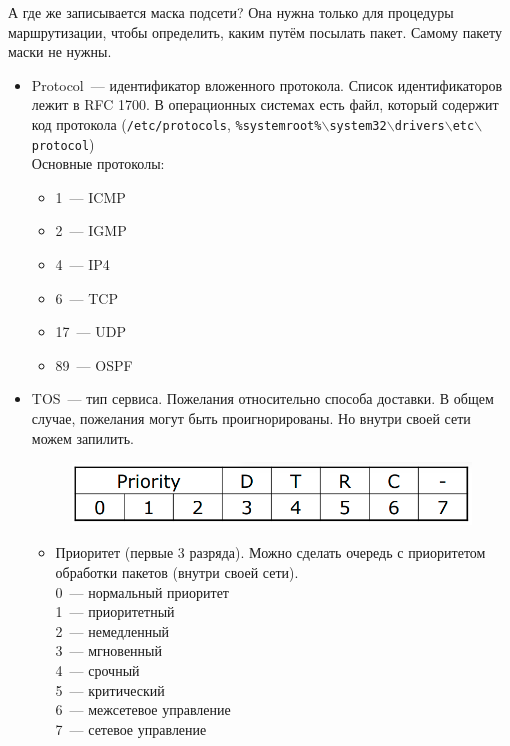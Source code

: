 А где же записывается маска подсети? Она нужна только для процедуры маршрутизации, чтобы определить, каким путём посылать пакет. Самому пакету маски не нужны. 

\begin{itemize}
    \item Protocol~--- идентификатор вложенного протокола. Список идентификаторов лежит в RFC 1700. В операционных системах есть файл, который содержит код протокола ({\tt /etc/protocols}, {\tt \%systemroot\%$\backslash$system32$\backslash$drivers$\backslash$etc$\backslash$protocol})\\
    Основные протоколы:
    \begin{itemize}
        \item 1~--- ICMP
        \item 2~--- IGMP
        \item 4~--- IP4
        \item 6~--- TCP
        \item 17~--- UDP
        \item 89~--- OSPF
    \end{itemize}
    \item TOS~--- тип сервиса. Пожелания относительно способа доставки. В общем случае, пожелания могут быть проигнорированы. Но внутри своей сети можем запилить.\\
    \begin{figure}[H]
        \centering
        \includegraphics[width=15cm]{images/02/02}
    \end{figure}
    \begin{itemize}
        \item Приоритет (первые 3 разряда). Можно сделать очередь с приоритетом обработки пакетов (внутри своей сети).\\
        0~--- нормальный приоритет\\
        1~--- приоритетный\\
        2~--- немедленный\\
        3~--- мгновенный\\
        4~--- срочный\\
        5~--- критический\\
        6~--- межсетевое управление\\ 
        7~--- сетевое управление\\


\end{itemize}
\end{itemize}
